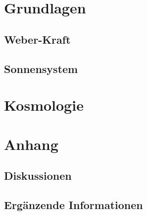 \documentclass{book}
\numberwithin{equation}{section}
\begin{document}
\part{Grundlagen}
\chapter{Weber-Kraft}





\chapter{Sonnensystem}



\part{Kosmologie}



\part{Anhang}
\chapter{Diskussionen}


\chapter{Ergänzende Informationen}

\end{document}
